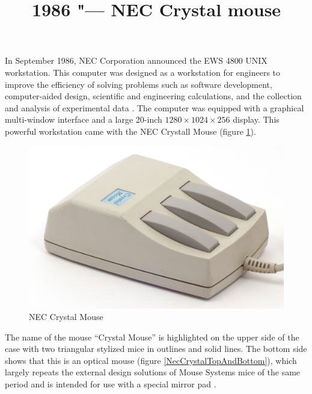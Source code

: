 \documentclass[11pt, a4paper]{article}
\begin{document}
\title{1986 "--- NEC Crystal mouse}
\date{}
\maketitle

In September 1986, NEC Corporation announced the EWS 4800 UNIX workstation. This computer was designed as a workstation for engineers to improve the efficiency of solving problems such as software development, computer-aided design, scientific and engineering calculations, and the collection and analysis of experimental data \cite{yt}. The computer was equipped with a graphical multi-window interface and a large 20-inch $1280 \times 1024 \times 256$ display. This powerful workstation came with the NEC Crystall Mouse (figure \ref{fig:NECCrystalPic}).

\begin{figure}[h]
    \centering
    \includegraphics[scale=0.7]{1986_nec_crystal_mouse/necNorm_30.jpg}
    \caption{NEC Crystal Mouse}
    \label{fig:NECCrystalPic}
\end{figure}

The name of the mouse “Crystal Mouse” is highlighted on the upper side of the case with two triangular stylized mice in outlines and solid lines. The bottom side shows that this is an optical mouse (figure \ref{NecCrystalTopAndBottom}), which largely repeats the external design solutions of Mouse Systems mice of the same period and is intended for use with a special mirror pad \cite{photo}.
\end{document}
